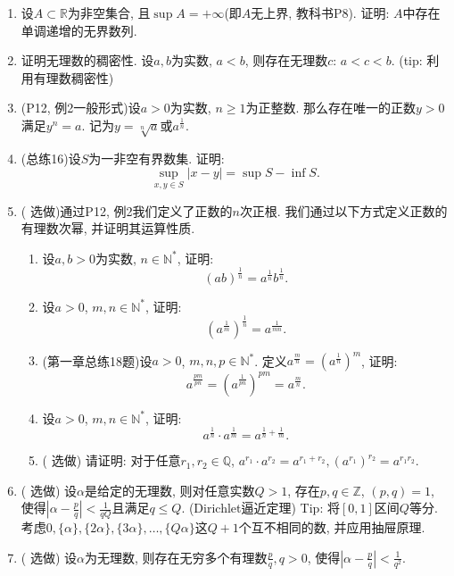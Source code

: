 \documentclass[UTF8,11pt, a4paper, oneside, fontset=none]{ctexbook}
\begin{document}
\begin{enumerate}
\item 设$A \subset \mathbb R$为非空集合, 且$\sup A = +\infty$(即$A$无上界, 教科书P8). 证明: $A$中存在单调递增的无界数列.

\item 证明无理数的稠密性. 设$a, b$为实数, $a<b$, 则存在无理数$c$: $a < c < b$. (tip: 利用有理数稠密性)

\item (P12, 例2一般形式)设$a > 0$为实数, $n \geq 1$为正整数. 那么存在唯一的正数$y > 0$满足$y^n = a$. 记为$y = \sqrt[n]{a}$或$a^{\frac{1}{n}}$.

\item (总练16)设$S$为一非空有界数集. 证明:
\[
\sup_{x,y\in S}|x - y| = \sup S - \inf S.
\]

\item ({\color{red} 选做})通过P12, 例2我们定义了正数的$n$次正根. 我们通过以下方式定义正数的有理数次幂, 并证明其运算性质.

\begin{enumerate}
\item 设$a, b >0$为实数, $n \in \mathbb N^*$, 证明:
\[
(ab)^{\frac{1}{n}} = a^{\frac{1}{n}} b^{\frac{1}{n}}.
\]
\item 设$a >0$, $m, n \in \mathbb N^*$, 证明:
\[
(a^{\frac{1}{m}})^{\frac{1}{n}} = a^{\frac{1}{mn}}.
\]
\item (第一章总练18题)设$a>0$, $m, n, p \in \mathbb N^*$. 定义$a^{\frac{m}{n}} = (a^{\frac{1}{n}})^m$, 证明:
\[
a^{\frac{pm}{pn}} = (a^{\frac{1}{pn}})^{pm} = a^{\frac{m}{n}}.
\]
\item 设$a>0$, $m, n \in \mathbb N^*$, 证明:
\[
a^{\frac{1}{n}} \cdot a^{\frac{1}{m}} = a^{\frac{1}{n} + \frac{1}{m}}.
\]
\item ({\color{red} 选做}) 请证明: 对于任意$r_1, r_2 \in \mathbb Q$, $a^{r_1} \cdot a^{r_2} = a^{r_1 + r_2}, (a^{r_1})^{r_2} = a^{r_1 r_2}$.
\end{enumerate}

\item ({\color{red} 选做}) 设$\alpha$是给定的无理数, 则对任意实数$Q>1$, 存在$p, q \in \mathbb Z$, $(p, q)=1$, 使得$|\alpha-\frac{p}{q}| < \frac{1}{qQ}$且满足$q \leq Q$. (Dirichlet逼近定理) Tip: 将$[0, 1]$区间$Q$等分. 考虑$0, \{ \alpha\}, \{ 2\alpha\}, \{ 3\alpha\}, \ldots, \{ Q\alpha\}$这$Q+1$个互不相同的数, 并应用抽屉原理.

\item ({\color{red} 选做}) 设$\alpha$为无理数, 则存在无穷多个有理数$\frac{p}{q}, q>0$, 使得$|\alpha - \frac{p}{q}| < \frac{1}{q^2}$. 

\end{enumerate}
\clearpage
\end{document}
